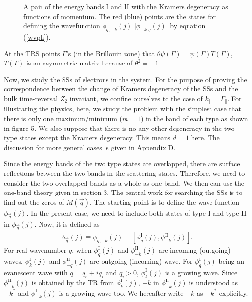\documentclass[aps,pra,amsmath,twocolumn,showpacs,bibnotes,10pt]{revtex4-1}
\begin{document}
\begin{figure}[t]
\centerline{}
\caption{A pair of the energy bands I and II with the Kramers degeneracy as functions of momentum. The red (blue) points are the states for defining the wavefunction $\phi_{q,-k}(j)$ [$\phi_{-k,q}(j)$] by equation (\ref{wvph}).} 
\end{figure}

At the TRS points $\Gamma$'s (in the Brillouin zone) that $\theta\psi(\Gamma)= \psi(\Gamma)T(\Gamma)$, $T(\Gamma)$ is an asymmetric matrix because of $\theta^2 = -1$. 

Now, we study the SSs of electrons in the system. For the purpose of proving the correspondence between the change of Kramers degeneracy of the SSs and the bulk time-reversal $Z_2$ invariant, we confine ourselves to the case of $k_{\parallel} = \Gamma_{\parallel}$. For illustrating the physics, here, we study the problem with the simplest case that there is only one maximum/minimum ($m = 1$) in the band of each type as shown in figure 5. We also suppose that there is no any other degeneracy in the two type states except the Kramers degeneracy. This means $d = 1$ here. The discussion for more general cases is given in Appendix D.
 
Since the energy bands of the two type states are overlapped, there are surface reflections between the two bands in the scattering states. Therefore, we need to consider the two overlapped bands as a whole as one band. We then can use the one-band theory given in section 3. The central work for searching the SSs is to find out the zeros of $M({\vec q})$. The starting point is to define the wave function $\phi_{\vec q}(j)$. In the present case, we need to include both states of type I and type II in $\phi_{\vec q}(j)$. Now, it is defined as
\begin{eqnarray}
\phi_{\vec q}(j)\equiv\phi_{q,-k}(j)= [\phi^{\text{I}}_{q}(j), \phi^{\text{II}}_{-k}(j)]. \label{wvph}
\end{eqnarray}
For real wavenumber $q$, when $\phi^{\text{I}}_{q}(j)$ and $\phi^{\text{II}}_{-k}(j)$ are incoming (outgoing) waves, $\phi^{\text{I}}_{k}(j)$ and $\phi^{\text{II}}_{-q}(j)$ are outgoing (incoming) wave. For $\phi^{\text{I}}_{q}(j)$ being an evanescent wave with $q = q_r +iq_i$ and $q_i > 0$, $\phi^{\text{I}}_{k}(j)$ is a growing wave. Since $\phi^{\text{II}}_{-k}(j)$ is obtained by the TR from $\phi^{\text{I}}_{k}(j)$, $-k$ in $\phi^{\text{II}}_{-k}(j)$ is understood as $-k^{\ast}$ and $\phi^{\text{II}}_{-k}(j)$ is a growing wave too. We hereafter write $-k$ as $-k^{\ast}$ explicitly.
\end{document}
